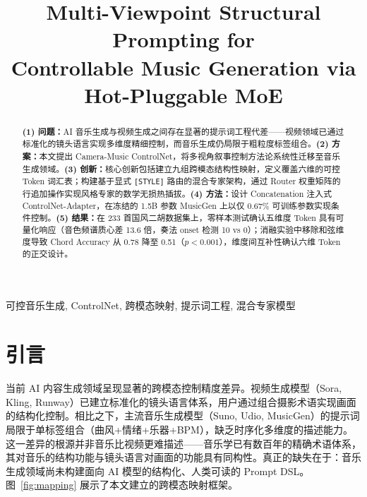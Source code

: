 \documentclass[conference]{IEEEtran}
\begin{document}
\title{Multi-Viewpoint Structural Prompting for\\ Controllable Music Generation via Hot-Pluggable MoE}

\author{
}

\maketitle

\begin{abstract}
\textbf{(1) 问题：}AI 音乐生成与视频生成之间存在显著的提示词工程代差——视频领域已通过标准化的镜头语言实现多维度精细控制，而音乐生成仍局限于粗粒度标签组合。\textbf{(2) 方案：}本文提出 Camera-Music ControlNet，将多视角叙事控制方法论系统性迁移至音乐生成领域。\textbf{(3) 创新：}核心创新包括建立九组跨模态结构性映射，定义覆盖六维的可控 Token 词汇表；构建基于显式 \texttt{[STYLE]} 路由的混合专家架构，通过 Router 权重矩阵的行追加操作实现风格专家的数学无损热插拔。\textbf{(4) 方法：}设计 Concatenation 注入式 ControlNet-Adapter，在冻结的 1.5B 参数 MusicGen 上以仅 0.67\% 可训练参数实现条件控制。\textbf{(5) 结果：}在 233 首国风二胡数据集上，零样本测试确认五维度 Token 具有可量化响应（音色频谱质心差 13.6 倍，奏法 onset 检测 10 vs 0）；消融实验中移除和弦维度导致 Chord Accuracy 从 0.78 降至 0.51（$p<0.001$），维度间互补性确认六维 Token 的正交设计。
\end{abstract}

\begin{IEEEkeywords}
可控音乐生成, ControlNet, 跨模态映射, 提示词工程, 混合专家模型
\end{IEEEkeywords}

\section{引言}

当前 AI 内容生成领域呈现显著的跨模态控制精度差异。视频生成模型（Sora, Kling, Runway）已建立标准化的镜头语言体系，用户通过组合摄影术语实现画面的结构化控制。相比之下，主流音乐生成模型（Suno, Udio, MusicGen）的提示词局限于单标签组合（曲风+情绪+乐器+BPM），缺乏时序化多维度的描述能力。这一差异的根源并非音乐比视频更难描述——音乐学已有数百年的精确术语体系，其对音乐的结构功能与镜头语言对画面的功能具有同构性。真正的缺失在于：音乐生成领域尚未构建面向 AI 模型的结构化、人类可读的 Prompt DSL。图~\ref{fig:mapping} 展示了本文建立的跨模态映射框架。
\end{document}
